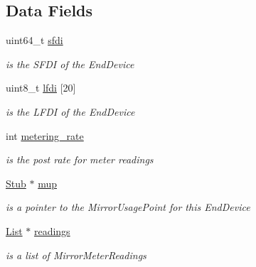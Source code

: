 \subsection*{Data Fields}
\begin{DoxyCompactItemize}
\item 
\mbox{\label{structDevice_ae4e72cd6c13d3a2b1c14d05633e04ecb}} 
uint64\+\_\+t \hyperlink{structDevice_ae4e72cd6c13d3a2b1c14d05633e04ecb}{sfdi}
\begin{DoxyCompactList}\small\item\em is the S\+F\+DI of the End\+Device \end{DoxyCompactList}\item 
\mbox{\label{structDevice_aebee5086907173f3172b6afd12e930ac}} 
uint8\+\_\+t \hyperlink{structDevice_aebee5086907173f3172b6afd12e930ac}{lfdi} \mbox{[}20\mbox{]}
\begin{DoxyCompactList}\small\item\em is the L\+F\+DI of the End\+Device \end{DoxyCompactList}\item 
\mbox{\label{structDevice_aa988dd4991dd6ec4ce48d72d5450142c}} 
int \hyperlink{structDevice_aa988dd4991dd6ec4ce48d72d5450142c}{metering\+\_\+rate}
\begin{DoxyCompactList}\small\item\em is the post rate for meter readings \end{DoxyCompactList}\item 
\mbox{\label{structDevice_a355c3754ed703678afe913c8f76e4999}} 
\hyperlink{structStub}{Stub} $\ast$ \hyperlink{structDevice_a355c3754ed703678afe913c8f76e4999}{mup}
\begin{DoxyCompactList}\small\item\em is a pointer to the Mirror\+Usage\+Point for this End\+Device \end{DoxyCompactList}\item 
\mbox{\label{structDevice_aa891882344911f2abb01ddf0ffc624ea}} 
\hyperlink{structList}{List} $\ast$ \hyperlink{structDevice_aa891882344911f2abb01ddf0ffc624ea}{readings}
\begin{DoxyCompactList}\small\item\em is a list of Mirror\+Meter\+Readings \end{DoxyCompactList}\item 

\end{DoxyCompactItemize}
